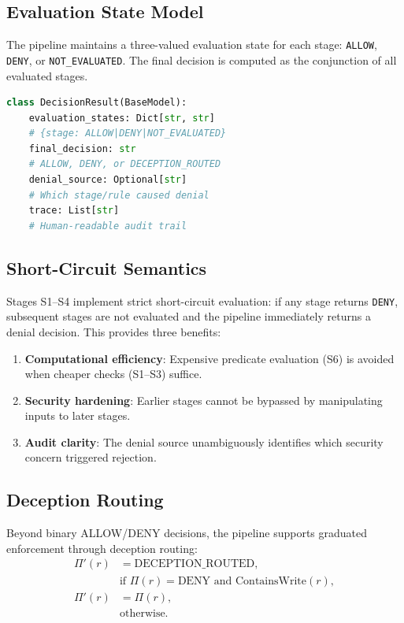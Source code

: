 \documentclass[10pt,a4paper,twocolumn]{article}
\begin{document}
\subsection{Evaluation State Model}
\label{sec:state_model}

The pipeline maintains a three-valued evaluation state for each stage: \texttt{ALLOW}, \texttt{DENY}, or \texttt{NOT\_EVALUATED}. The final decision is computed as the conjunction of all evaluated stages.

\begin{lstlisting}[language=Python, caption={Decision result data model.}]
class DecisionResult(BaseModel):
    evaluation_states: Dict[str, str]
    # {stage: ALLOW|DENY|NOT_EVALUATED}
    final_decision: str
    # ALLOW, DENY, or DECEPTION_ROUTED
    denial_source: Optional[str]
    # Which stage/rule caused denial
    trace: List[str]
    # Human-readable audit trail
\end{lstlisting}

\subsection{Short-Circuit Semantics}
\label{sec:short_circuit}

Stages S1--S4 implement strict short-circuit evaluation: if any stage returns \texttt{DENY}, subsequent stages are not evaluated and the pipeline immediately returns a denial decision. This provides three benefits:

\begin{enumerate}
  \item \textbf{Computational efficiency}: Expensive predicate evaluation (S6) is avoided when cheaper checks (S1--S3) suffice.
  \item \textbf{Security hardening}: Earlier stages cannot be bypassed by manipulating inputs to later stages.
  \item \textbf{Audit clarity}: The denial source unambiguously identifies which security concern triggered rejection.
\end{enumerate}

\subsection{Deception Routing}
\label{sec:deception}

Beyond binary ALLOW/DENY decisions, the pipeline supports graduated enforcement through deception routing:
\begin{equation}
\begin{aligned}
\Pi'(r) &= \text{DECEPTION\_ROUTED}, \\
&\text{if } \Pi(r) = \text{DENY} \text{ and } \text{ContainsWrite}(r), \\
\Pi'(r) &= \Pi(r), \\
&\text{otherwise.}
\end{aligned}
\label{eq:deception}
\end{equation}
\end{document}

